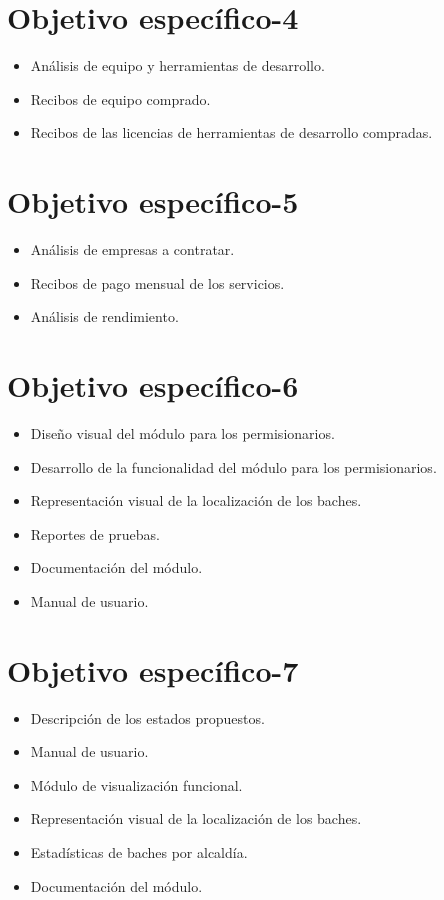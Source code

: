 \section{Objetivo específico-4}
\begin{itemize}
    \item Análisis de equipo y herramientas de desarrollo.
    \item Recibos de equipo comprado.
    \item Recibos de las licencias de herramientas de desarrollo compradas.
\end{itemize}

\section{Objetivo específico-5}
\begin{itemize}
    \item Análisis de empresas a contratar.
    \item Recibos de pago mensual de los servicios.
    \item Análisis de rendimiento.
\end{itemize}

\section{Objetivo específico-6}
\begin{itemize}
    \item Diseño visual del módulo para los permisionarios. 
    \item Desarrollo de la funcionalidad del módulo para los permisionarios.
    \item Representación visual de la localización de los baches.
    \item Reportes de pruebas. 
    \item Documentación del módulo.
    \item Manual de usuario.
\end{itemize}

\section{Objetivo específico-7}
\begin{itemize}
    \item Descripción de los estados propuestos.
    \item Manual de usuario.
    \item Módulo de visualización funcional.
    \item Representación visual de la localización de los baches.
    \item Estadísticas de baches por alcaldía.
    \item Documentación del módulo.
\end{itemize}

